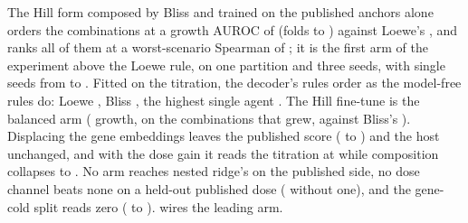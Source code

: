 

 The Hill form composed by Bliss and trained on the published anchors
alone orders the combinations at a growth AUROC of \rElevenzsAuroc{} (folds
\rElevenzsAurocMin{} to \rElevenzsAurocMax{}) against Loewe's \hydloeweAuroc{}, and ranks
all of them at a worst-scenario Spearman of \rElevenzsWorst{}; it is the first arm of the
experiment above the Loewe rule, on one partition and three seeds, with single seeds from
\rElevenzsSeedMin{} to \rElevenzsSeedMax{}. Fitted on the titration, the decoder's rules
order as the model-free rules do: Loewe \rElevenloeweAuroc{}, Bliss \rElevenhillAuroc{},
the highest single agent \rElevenhsaAuroc{}. The Hill fine-tune is the balanced arm
(\rElevenftAuroc{} growth, \rElevenftGrown{} on the combinations that grew, against
Bliss's \hydblissSpearman{}). Displacing the gene embeddings leaves the published score
(\rElevenoperatorVanMin{} to \rElevenoperatorVanMax{}) and the host unchanged, and with the
dose gain it reads the titration at \rElevendisplaceDoffTit{} while composition collapses
to \rElevendisplaceDoffAuroc{}. No arm reaches nested ridge's \hydladderRidge{} on the
published side, no dose channel beats none on a held-out published dose
(\rElevendoseOff{} without one), and the gene-cold split reads zero
(\rElevengeneMin{} to \rElevengeneMax{}).  wires the leading arm.




